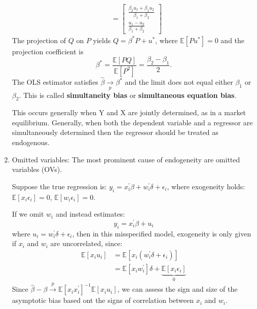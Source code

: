 \begin{enumerate}
\begin{eg}
\begin{align*}
                &= \begin{bmatrix}
                    \frac{\beta_2 u_1 + \beta_1 u_2}{\beta_1 + \beta_2} \\
                    \frac{u_1 - u_2}{\beta_1 + \beta_2}
                \end{bmatrix}
            \end{align*}
            The projection of $Q$ on $P$ yields $Q = \beta^* P + u^*$, where $\mathbb{E}[P u^*]=0$ and the projection coefficient is
            \[\beta^* = \frac{\mathbb{E}[PQ]}{\mathbb{E}[P^2]} = \frac{\beta_2 - \beta_1}{2}.\]
            The OLS estimator satisfies $\hat{\beta} \underset{p}{\rightarrow} \beta^*$ and the limit does not equal either $\beta_1$ or $\beta_2$.
            This is called \textbf{simultaneity bias} or \textbf{simultaneous equation bias}.

            This occurs generally when Y and X are jointly determined, as in a market equilibrium.
            Generally, when both the dependent variable and a regressor are simultaneously determined then the regressor should be treated as endogenous.
        \end{eg}

    \item Omitted variables: The most prominent cause of endogeneity are omitted variables (OVs).

        Suppose the true regression is: $y_i = x_i^{\prime} \beta + w_i^{\prime} \delta +\epsilon_i$, 
        where exogeneity holds: $\mathbb{E}[x_i \epsilon_i] = 0$, $\mathbb{E}[w_i \epsilon_i] = 0$.
 
        If we omit $w_i$ and instead estimates:
        \[y_i = x_i^{\prime} \beta + u_i\]
        where $u_i = w_i^{\prime} \delta + \epsilon_i$,
        then in this misspecified model, exogeneity is only given if $x_i$ and $w_i$ are uncorrelated, since:
        \begin{align*}
            \mathbb{E}[x_i u_i] &= \mathbb{E}[x_i(w_i^{\prime} \delta + \epsilon_i)] \\
            &= \mathbb{E}[x_i w_i^{\prime}]\delta + \underset{0}{\underbrace{\mathbb{E}[x_i \epsilon_i]}}
        \end{align*}
        Since $\hat{\beta} - \beta \overset{p}{\rightarrow} \mathbb{E}[x_i x_i^{\prime}]^{-1} \mathbb{E}[x_i u_i]$,
        we can assess the sign and size of the asymptotic bias based ont the signs of correlation between $x_i$ and $w_i$.
\end{enumerate}

